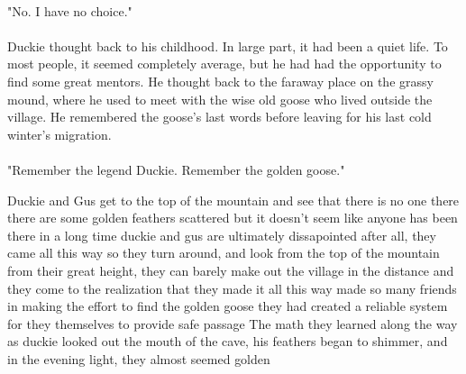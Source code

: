 \documentclass[a4paper,10pt,standalone]{book}
\begin{document}
\paragraph{} "No. I have no choice." 
\paragraph{} Duckie thought back to his childhood. In large part, it had been a quiet life. To most people, it seemed completely average, but he had had the opportunity to find some great mentors. He thought back to the faraway place on the grassy mound, where he used to meet with the wise old goose who lived outside the village. He remembered the goose's last words before leaving for his last cold winter's migration.
\paragraph{} "Remember the legend Duckie. Remember the golden goose." 
\vfill
\pagebreak









Duckie and Gus get to the top of the mountain
and see that there is no one there
there are some golden feathers scattered
but it doesn't seem like anyone has been there in a long time
duckie and gus are ultimately dissapointed
after all, they came all this way
so they turn around, and look from the top of the mountain
from their great height, they can barely make out the village in the distance
and they come to the realization that
they made it all this way
made so many friends
in making the effort to find the golden goose
they had created a reliable system for they themselves to provide safe passage
The math they learned along the way
as duckie looked out the mouth of the cave, his feathers began to shimmer, and in the evening light, they almost seemed golden
\end{document}
